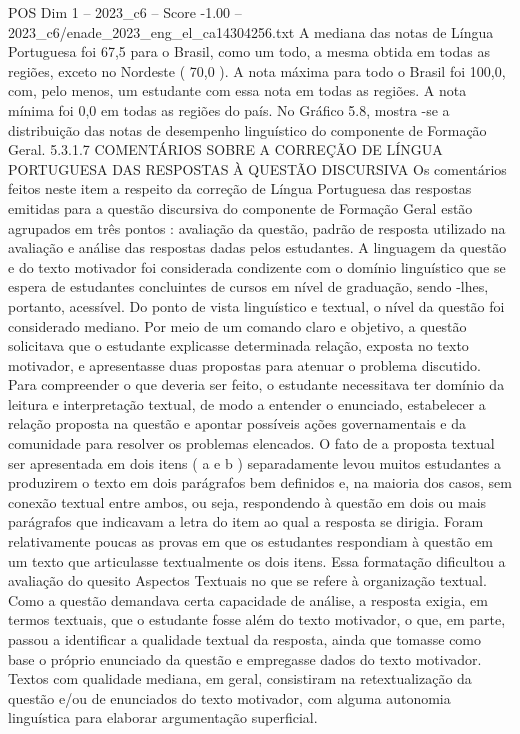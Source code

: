 \begin{textsample}{POS Dim 1 – 2023\_c6 – Score -1.00 – 2023\_c6/enade\_2023\_eng\_el\_ca14304256.txt}
A mediana das notas de Língua Portuguesa foi 67,5 para o Brasil, como um todo, a mesma obtida em todas as regiões, exceto no Nordeste ( 70,0 ).
A nota máxima para todo o Brasil foi 100,0, com, pelo menos, um estudante com essa nota em todas as regiões.
A nota mínima foi 0,0 em todas as regiões do país.
No Gráfico 5.8, mostra -se a distribuição das notas de desempenho linguístico do componente de Formação Geral. 5.3.1.7 COMENTÁRIOS SOBRE A CORREÇÃO DE LÍNGUA PORTUGUESA DAS RESPOSTAS À QUESTÃO DISCURSIVA Os comentários feitos neste item a respeito da correção de Língua Portuguesa das respostas emitidas para a questão discursiva do componente de Formação Geral estão agrupados em três pontos : avaliação da questão, padrão de resposta utilizado na avaliação e análise das respostas dadas pelos estudantes.
A linguagem da questão e do texto motivador foi considerada condizente com o domínio linguístico que se espera de estudantes concluintes de cursos em nível de graduação, sendo -lhes, portanto, acessível.
Do ponto de vista linguístico e textual, o nível da questão foi considerado mediano.
Por meio de um comando claro e objetivo, a questão solicitava que o estudante explicasse determinada relação, exposta no texto motivador, e apresentasse duas propostas para atenuar o problema discutido.
Para compreender o que deveria ser feito, o estudante necessitava ter domínio da leitura e interpretação textual, de modo a entender o enunciado, estabelecer a relação proposta na questão e apontar possíveis ações governamentais e da comunidade para resolver os problemas elencados.
O fato de a proposta textual ser apresentada em dois itens ( a e b ) separadamente levou muitos estudantes a produzirem o texto em dois parágrafos bem definidos e, na maioria dos casos, sem conexão textual entre ambos, ou seja, respondendo à questão em dois ou mais parágrafos que indicavam a letra do item ao qual a resposta se dirigia.
Foram relativamente poucas as provas em que os estudantes respondiam à questão em um texto que articulasse textualmente os dois itens.
Essa formatação dificultou a avaliação do quesito Aspectos Textuais no que se refere à organização textual.
Como a questão demandava certa capacidade de análise, a resposta exigia, em termos textuais, que o estudante fosse além do texto motivador, o que, em parte, passou a identificar a qualidade textual da resposta, ainda que tomasse como base o próprio enunciado da questão e empregasse dados do texto motivador.
Textos com qualidade mediana, em geral, consistiram na retextualização da questão e/ou de enunciados do texto motivador, com alguma autonomia linguística para elaborar argumentação superficial.

\end{textsample}
